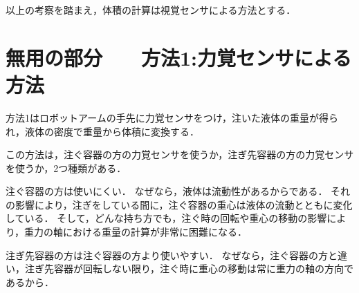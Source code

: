 以上の考察を踏まえ，体積の計算は視覚センサによる方法とする．
\section{無用の部分　　方法1:力覚センサによる方法}
方法1はロボットアームの手先に力覚センサをつけ，注いた液体の重量が得られ，液体の密度で重量から体積に変換する．

この方法は，注ぐ容器の方の力覚センサを使うか，注ぎ先容器の方の力覚センサを使うか，2つ種類がある．

注ぐ容器の方は使いにくい．
なぜなら，液体は流動性があるからである．
それの影響により，注ぎをしている間に，注ぐ容器の重心は液体の流動とともに変化している．
そして，どんな持ち方でも，注ぐ時の回転や重心の移動の影響により，重力の軸における重量の計算が非常に困難になる．

注ぎ先容器の方は注ぐ容器の方より使いやすい．
なぜなら，注ぐ容器の方と違い，注ぎ先容器が回転しない限り，注ぐ時に重心の移動は常に重力の軸の方向であるから．

\fi